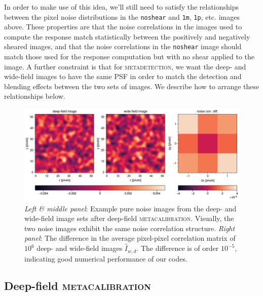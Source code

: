 \documentclass[twocolumn]{openjournal}
\makeatletter
\newcommand{\mdet}{\textsc{metadetection}\@\xspace}
\newcommand{\mcal}{\textsc{metacalibration}\@\xspace}
\newcommand{\noshear}{\texttt{noshear}\@\xspace}
\makeatother
\begin{document}
In order to make use of this idea, we'll still need to satisfy the relationships between
the pixel noise distributions in the \noshear and \texttt{1m}, \texttt{1p}, etc. images
above. These properties are that the noise correlations in the images used to compute
the response match statistically between the positively and negatively sheared images,
and that the noise correlations in the \noshear image should match those used for the
response computation but with no shear applied to the image. A further constraint is
that for \mdet, we want the deep- and wide-field images to have the same PSF in order
to match the detection and blending effects between the two sets of images. We describe
how to arrange these relationships below.

\begin{figure}
    \centering
    \includegraphics[width=\linewidth]{noise_corr.png}
    \caption{
      \textit{Left \& middle panel}: Example pure noise images from the deep- and wide-field image
      sets after deep-field \mcal. Visually, the two noise images exhibit the same noise correlation structure.
      \textit{Right panel}: The difference in the average pixel-pixel correlation matrix of $10^6$ deep- and
      wide-field images $\hat I_{w,d}$. The difference is of order $10^{-5}$, indicating good numerical
      performance of our codes.
    } \label{fig:pixel_correlation}
\end{figure}


\subsection{Deep-field \mcal}\label{sec:deepmcal}
\end{document}

